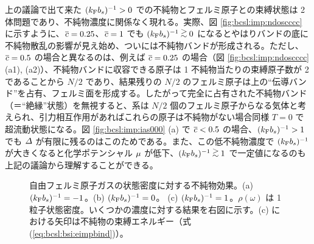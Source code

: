 上の議論で出て来た $(k_{\text{F}} b_s)^{-1}>0$ での不純物とフェルミ原子との束縛状態は 2 体問題であり、不純物濃度に関係なく現れる。実際、図 \ref{fig:bcsl:imp:ndoscccc} に示すように、$\overline{c}=0.25$、$\overline{c}=1$ でも $\bskfi\gtsim0$ になるとやはりバンドの底に不純物散乱の影響が見え始め、ついには不純物バンドが形成される。ただし、$\overline{c} =0.5$ の場合と異なるのは、例えば $\overline{c}=0.25$ の場合（図 \ref{fig:bcsl:imp:ndoscccc} (a1), (a2)）、不純物バンドに収容できる原子は 1 不純物当たりの束縛原子数が 2 であることから $N/2$ であり、結果残りの $N/2$ のフェルミ原子は上の“伝導バンド”を占有、フェルミ面を形成する。したがって完全に占有された不純物バンド（＝“絶縁”状態）を無視すると、系は $N/2$ 個のフェルミ原子からなる気体と考えられ、引力相互作用があればこれらの原子は不純物がない場合同様 $T=0$ で超流動状態になる。図 \ref{fig:bcsl:imp:ias000} (a) で $\overline{c}<0.5$ の場合、$(k_{\text{F}} b_s)^{-1}>1$ でも $\varDelta$ が有限に残るのはこのためである。また、この低不純物濃度で $(k_{\text{F}} b_s)^{-1}$ が大きくなると化学ポテンシャル $\mu$ が低下、$\bskfi\gtsim1$ で一定値になるのも上記の議論から理解することができる。
\begin{figure}[t]
\centering
{}
\caption{自由フェルミ原子ガスの状態密度に対する不純物効果。(a) $(k_{\text{F}} b_s)^{-1}=-1$。(b) $(k_{\text{F}} b_s)^{-1}=0$。 (c) $(k_{\text{F}} b_s)^{-1}=1$。$\rho(\omega)$ は 1 粒子状態密度。いくつかの濃度に対する結果を右図に示す。(c) における矢印は不純物の束縛エネルギー（式 (\ref{eq:bcsl:bsi:eimpbind})）。}
\label{fig:bcsl:imp:ndosibs}
\end{figure}

